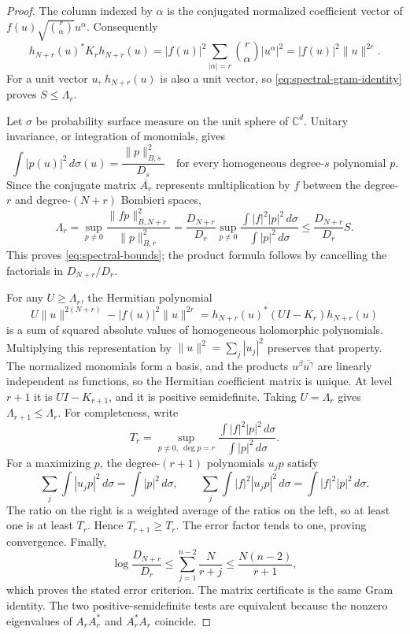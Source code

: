 \documentclass[11pt]{article}
\theoremstyle{remark}
\newcommand{\C}{\mathbb C}
\numberwithin{equation}{section}
\begin{document}
\begin{proof}
The column indexed by $\alpha$ is the conjugated normalized coefficient
vector of $f(u)\sqrt{\binom r\alpha}u^\alpha$. Consequently
\begin{equation}\label{eq:spectral-gram-identity}
 h_{N+r}(u)^*K_rh_{N+r}(u)
 =|f(u)|^2\sum_{|\alpha|=r}\binom r\alpha|u^\alpha|^2
 =|f(u)|^2\|u\|^{2r}.
\end{equation}
For a unit vector $u$, $h_{N+r}(u)$ is also a unit vector, so
\eqref{eq:spectral-gram-identity} proves $S\le\Lambda_r$.

Let $\sigma$ be probability surface measure on the unit sphere of
$\C^d$. Unitary invariance, or integration of monomials, gives
\begin{equation}\label{eq:bombieri-sphere}
 \int|p(u)|^2\,d\sigma(u)=\frac{\|p\|_{B,s}^2}{D_s}
 \quad\text{for every homogeneous degree-$s$ polynomial }p.
\end{equation}
Since the conjugate matrix $\overline{A_r}$ represents multiplication
by $f$ between the degree-$r$ and degree-$(N+r)$ Bombieri spaces,
\[
 \Lambda_r=\sup_{p\ne0}
   \frac{\|fp\|_{B,N+r}^2}{\|p\|_{B,r}^2}
 =\frac{D_{N+r}}{D_r}\sup_{p\ne0}
   \frac{\int|f|^2|p|^2\,d\sigma}{\int|p|^2\,d\sigma}
 \le\frac{D_{N+r}}{D_r}S.
\]
This proves \eqref{eq:spectral-bounds}; the product formula follows
by cancelling the factorials in $D_{N+r}/D_r$.

For any $U\ge\Lambda_r$, the Hermitian polynomial
\[
 U\|u\|^{2(N+r)}-|f(u)|^2\|u\|^{2r}
 =h_{N+r}(u)^*(UI-K_r)h_{N+r}(u)
\]
is a sum of squared absolute values of homogeneous holomorphic
polynomials. Multiplying this representation by
$\|u\|^2=\sum_j|u_j|^2$ preserves that property. The normalized
monomials form a basis, and the products
$u^\beta\overline{u^\gamma}$ are linearly independent as functions,
so the Hermitian coefficient matrix is unique. At level $r+1$ it is
$UI-K_{r+1}$, and it is positive semidefinite. Taking
$U=\Lambda_r$ gives $\Lambda_{r+1}\le\Lambda_r$.
For completeness, write
\[
 T_r=\sup_{p\ne0,\ \deg p=r}
 \frac{\int|f|^2|p|^2\,d\sigma}{\int|p|^2\,d\sigma}.
\]
For a maximizing $p$, the degree-$(r+1)$ polynomials $u_jp$ satisfy
\[
 \sum_j\int|u_jp|^2\,d\sigma=\int|p|^2\,d\sigma,
 \qquad
 \sum_j\int|f|^2|u_jp|^2\,d\sigma
       =\int|f|^2|p|^2\,d\sigma.
\]
The ratio on the right is a weighted average of the ratios on the
left, so at least one is at least $T_r$. Hence $T_{r+1}\ge T_r$.
The error factor tends to one, proving convergence. Finally,
\[
 \log\frac{D_{N+r}}{D_r}
 \le\sum_{j=1}^{n-2}\frac{N}{r+j}
 \le\frac{N(n-2)}{r+1},
\]
which proves the stated error criterion. The matrix certificate is
the same Gram identity. The two positive-semidefinite tests are
equivalent because the nonzero eigenvalues of $A_rA_r^*$ and
$A_r^*A_r$ coincide.
\end{proof}
\end{document}
